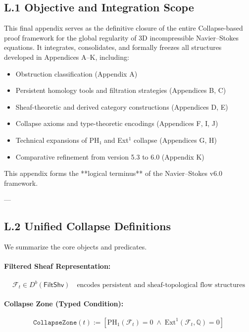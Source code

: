 \documentclass[11pt]{article}
\begin{document}
\subsection*{L.1 Objective and Integration Scope}

This final appendix serves as the definitive closure of the entire Collapse-based proof framework  
for the global regularity of 3D incompressible Navier–Stokes equations.  
It integrates, consolidates, and formally freezes all structures developed in Appendices A–K, including:

\begin{itemize}
  \item Obstruction classification (Appendix A)
  \item Persistent homology tools and filtration strategies (Appendices B, C)
  \item Sheaf-theoretic and derived category constructions (Appendices D, E)
  \item Collapse axioms and type-theoretic encodings (Appendices F, I, J)
  \item Technical expansions of PH₁ and Ext$^1$ collapse (Appendices G, H)
  \item Comparative refinement from version 5.3 to 6.0 (Appendix K)
\end{itemize}

This appendix forms the **logical terminus** of the Navier–Stokes v6.0 framework.

---

\subsection*{L.2 Unified Collapse Definitions}

We summarize the core objects and predicates.

\paragraph{Filtered Sheaf Representation:}
\[
\mathcal{F}_t \in D^b(\mathsf{FiltShv})
\quad \text{encodes persistent and sheaf-topological flow structures}
\]

\paragraph{Collapse Zone (Typed Condition):}
\[
\texttt{CollapseZone}(t) :=
\left[
\mathrm{PH}_1(\mathcal{F}_t) = 0
\;\land\;
\mathrm{Ext}^1(\mathcal{F}_t, \mathbb{Q}) = 0
\right]
\]
\end{document}
